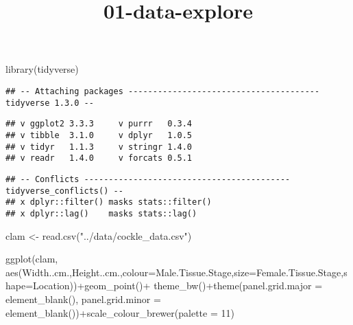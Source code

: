 \documentclass[
]{article}
\title{01-data-explore}
\author{}
\date{\vspace{-2.5em}}
\newenvironment{Shaded}{\begin{snugshade}}{\end{snugshade}}
\newcommand{\AttributeTok}[1]{\textcolor[rgb]{0.77,0.63,0.00}{#1}}
\newcommand{\DecValTok}[1]{\textcolor[rgb]{0.00,0.00,0.81}{#1}}
\newcommand{\FunctionTok}[1]{\textcolor[rgb]{0.00,0.00,0.00}{#1}}
\newcommand{\NormalTok}[1]{#1}
\newcommand{\OtherTok}[1]{\textcolor[rgb]{0.56,0.35,0.01}{#1}}
\newcommand{\SpecialCharTok}[1]{\textcolor[rgb]{0.00,0.00,0.00}{#1}}
\newcommand{\StringTok}[1]{\textcolor[rgb]{0.31,0.60,0.02}{#1}}
\begin{document}
\maketitle

\begin{Shaded}
\begin{Highlighting}[]
\FunctionTok{library}\NormalTok{(tidyverse)}
\end{Highlighting}
\end{Shaded}

\begin{verbatim}
## -- Attaching packages --------------------------------------- tidyverse 1.3.0 --
\end{verbatim}

\begin{verbatim}
## v ggplot2 3.3.3     v purrr   0.3.4
## v tibble  3.1.0     v dplyr   1.0.5
## v tidyr   1.1.3     v stringr 1.4.0
## v readr   1.4.0     v forcats 0.5.1
\end{verbatim}

\begin{verbatim}
## -- Conflicts ------------------------------------------ tidyverse_conflicts() --
## x dplyr::filter() masks stats::filter()
## x dplyr::lag()    masks stats::lag()
\end{verbatim}

\begin{Shaded}
\begin{Highlighting}[]
\NormalTok{clam }\OtherTok{\textless{}{-}} \FunctionTok{read.csv}\NormalTok{(}\StringTok{"../data/cockle\_data.csv"}\NormalTok{)}
\end{Highlighting}
\end{Shaded}

\begin{Shaded}
\begin{Highlighting}[]
\FunctionTok{ggplot}\NormalTok{(clam, }\FunctionTok{aes}\NormalTok{(}\StringTok{\textasciigrave{}}\AttributeTok{Width..cm.}\StringTok{\textasciigrave{}}\NormalTok{,}\StringTok{\textasciigrave{}}\AttributeTok{Height..cm.}\StringTok{\textasciigrave{}}\NormalTok{,}\AttributeTok{colour=}\StringTok{\textasciigrave{}}\AttributeTok{Male.Tissue.Stage}\StringTok{\textasciigrave{}}\NormalTok{,}\AttributeTok{size=}\StringTok{\textasciigrave{}}\AttributeTok{Female.Tissue.Stage}\StringTok{\textasciigrave{}}\NormalTok{,}\AttributeTok{shape=}\NormalTok{Location))}\SpecialCharTok{+}\FunctionTok{geom\_point}\NormalTok{()}\SpecialCharTok{+}
\FunctionTok{theme\_bw}\NormalTok{()}\SpecialCharTok{+}\FunctionTok{theme}\NormalTok{(}\AttributeTok{panel.grid.major =} \FunctionTok{element\_blank}\NormalTok{(),}
                \AttributeTok{panel.grid.minor =} \FunctionTok{element\_blank}\NormalTok{())}\SpecialCharTok{+}\FunctionTok{scale\_colour\_brewer}\NormalTok{(}\AttributeTok{palette =} \DecValTok{11}\NormalTok{)}
\end{Highlighting}
\end{Shaded}
\end{document}
